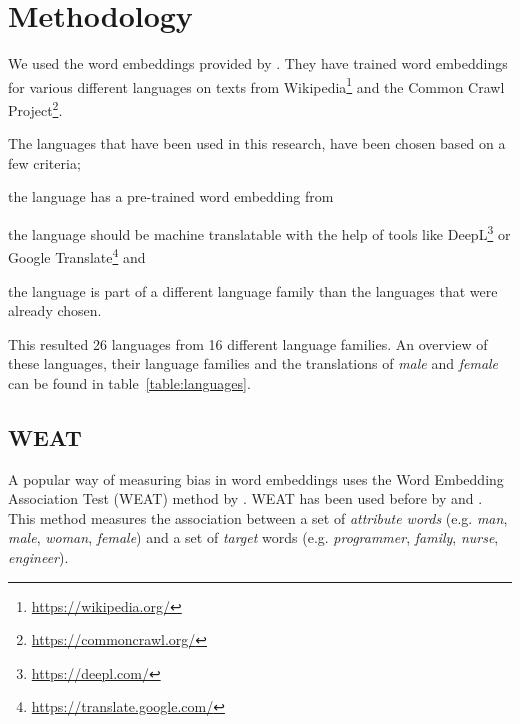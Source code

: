 \section{Methodology}
We used the word embeddings provided by \textcite{grave2018learning}. They have
trained word embeddings for various different languages on texts from
Wikipedia\footnote{\url{https://wikipedia.org/}} and
the Common Crawl Project\footnote{\url{https://commoncrawl.org/}}.

The languages that have been used in this research, have been chosen based on a
few criteria;
\begin{enumerate*}[label={(\alph*)}]
    \item the language has a pre-trained word embedding from \textcite{grave2018learning}
    \item the language should be machine translatable with the help of tools like
        DeepL\footnote{\url{https://deepl.com/}} or
        Google Translate\footnote{\url{https://translate.google.com/}} and
    \item the language is part of a different language family than the languages that
    were already chosen.
\end{enumerate*}
This resulted 26 languages from 16 different language families. An overview of these languages, their language families and the translations of \textit{male} and \textit{female}
can be found in table~\ref{table:languages}.

\subsection{WEAT}
A popular way of measuring bias in word embeddings uses the 
Word Embedding Association Test (WEAT) method by
\textcite{caliskan_2017_semantics_language_corpora}. 
WEAT has been used before by \textcite{gonen-goldberg-2019-lipstick-pig}
and \textcite{10.1145/3306618.3314270}.
This method measures the
association between a set of \textit{attribute words} (e.g. \textit{man}, \textit{male},
\textit{woman}, \textit{female}) 
and a set of \textit{target} words (e.g. \textit{programmer}, \textit{family},
\textit{nurse}, \textit{engineer}). 

